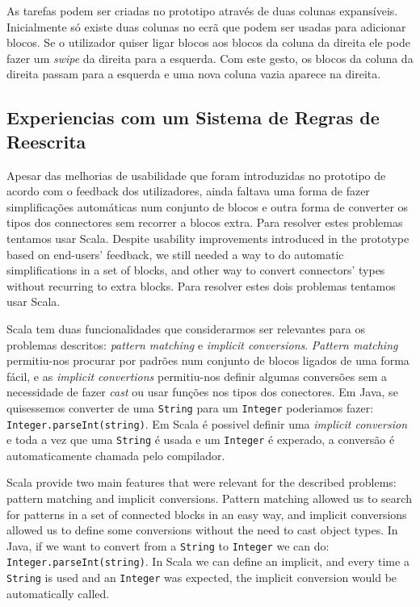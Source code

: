 \documentclass[9pt,a4paper]{extarticle}
\begin{document}
\begin{multicols}{2}
As tarefas podem ser criadas no prototipo através de duas colunas expansíveis. Inicialmente só existe duas colunas no ecrã que podem ser usadas para adicionar blocos. Se o utilizador quiser ligar blocos aos blocos da coluna da direita ele pode fazer um \emph{swipe} da direita para a esquerda. Com este gesto, os blocos da coluna da direita passam para a esquerda e uma nova coluna vazia aparece na direita.

\subsection{Experiencias com um Sistema de Regras de Reescrita}

Apesar das melhorias de usabilidade que foram introduzidas no prototipo de acordo com o feedback dos utilizadores, ainda faltava uma forma de fazer simplificações automáticas num conjunto de blocos e outra forma de converter os tipos dos connectores sem recorrer a blocos extra. Para resolver estes problemas tentamos usar Scala.
Despite usability improvements introduced in the prototype based on end-users' feedback, we still needed a way to do automatic simplifications in a set of blocks, and other way to convert connectors' types without recurring
to extra blocks. Para resolver estes dois problemas tentamos usar Scala.

Scala tem duas funcionalidades que considerarmos ser relevantes para os problemas descritos: \emph{pattern matching} e \emph{implicit conversions}. \emph{Pattern matching} permitiu-nos procurar por padrões num conjunto de blocos ligados de uma forma fácil, e as \emph{implicit convertions} permitiu-nos definir algumas conversões sem a necessidade de fazer \emph{cast} ou usar funções nos tipos dos conectores. Em Java, se quisessemos converter de uma \texttt{String} para um \texttt{Integer} poderiamos fazer: \texttt{Integer.parseInt(string)}. Em Scala é possivel definir uma \emph{implicit conversion} e toda a vez que uma \texttt{String} é usada e um \texttt{Integer} é experado, a conversão é automaticamente chamada pelo compilador.

Scala provide two main features that were relevant for the described problems: pattern matching and implicit conversions. Pattern matching allowed us to search for patterns in a set of connected blocks in an easy way, and implicit conversions allowed us to define some conversions without the need to cast object types. In Java, if we want to convert from a \texttt{String} to \texttt{Integer} we can do: \texttt{Integer.parseInt(string)}. In Scala we can define an implicit,
and every time a \texttt{String} is used and an \texttt{Integer} was expected, the implicit conversion would be automatically called.


\end{multicols}
\end{document}
